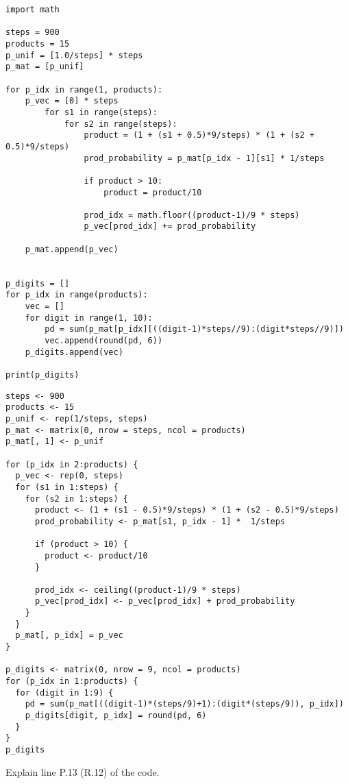\begin{verbatim}
import math

steps = 900
products = 15
p_unif = [1.0/steps] * steps
p_mat = [p_unif]

for p_idx in range(1, products):
    p_vec = [0] * steps
        for s1 in range(steps):
            for s2 in range(steps):
                product = (1 + (s1 + 0.5)*9/steps) * (1 + (s2 + 0.5)*9/steps)
                prod_probability = p_mat[p_idx - 1][s1] * 1/steps

                if product > 10:
                    product = product/10

                prod_idx = math.floor((product-1)/9 * steps)
                p_vec[prod_idx] += prod_probability

    p_mat.append(p_vec)


p_digits = []
for p_idx in range(products):
    vec = []
    for digit in range(1, 10):
        pd = sum(p_mat[p_idx][((digit-1)*steps//9):(digit*steps//9)])
        vec.append(round(pd, 6))
    p_digits.append(vec)

print(p_digits)
\end{verbatim}


\begin{verbatim}
steps <- 900
products <- 15
p_unif <- rep(1/steps, steps)
p_mat <- matrix(0, nrow = steps, ncol = products)
p_mat[, 1] <- p_unif

for (p_idx in 2:products) {
  p_vec <- rep(0, steps)
  for (s1 in 1:steps) {
    for (s2 in 1:steps) {
      product <- (1 + (s1 - 0.5)*9/steps) * (1 + (s2 - 0.5)*9/steps)
      prod_probability <- p_mat[s1, p_idx - 1] *  1/steps

      if (product > 10) {
        product <- product/10
      }

      prod_idx <- ceiling((product-1)/9 * steps)
      p_vec[prod_idx] <- p_vec[prod_idx] + prod_probability
    }
  }
  p_mat[, p_idx] = p_vec
}

p_digits <- matrix(0, nrow = 9, ncol = products)
for (p_idx in 1:products) {
  for (digit in 1:9) {
    pd = sum(p_mat[((digit-1)*(steps/9)+1):(digit*(steps/9)), p_idx])
    p_digits[digit, p_idx] = round(pd, 6)
  }
}
p_digits
\end{verbatim}

\vspace{5pt}

\begin{exercise}
Explain line P.13 (R.12) of the code.
\end{exercise}

